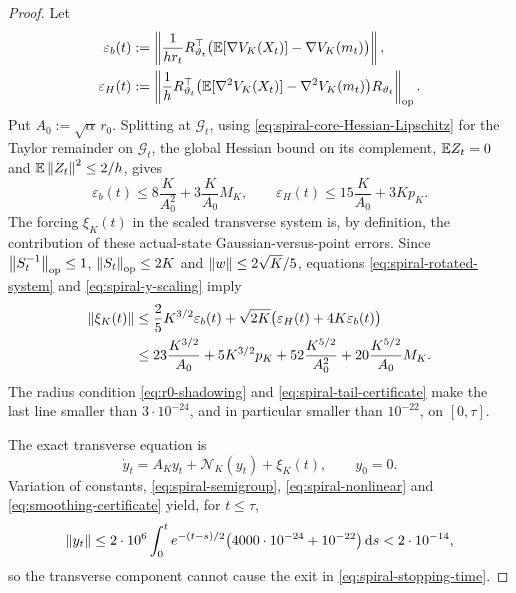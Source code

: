 \begin{proof}
    Let
    \begin{align*}
        \varepsilon_b(t)
        &:=\left\|\frac1{hr_t}R_{\vartheta_t}^\top
            \bigl(\mathbb{E}[\nabla V_K(X_t)]-\nabla V_K(m_t)\bigr)\right\|,\\
        \varepsilon_H(t)
        &:=\left\|\frac1hR_{\vartheta_t}^\top
            \bigl(\mathbb{E}[\nabla^2V_K(X_t)]-\nabla^2V_K(m_t)\bigr)R_{\vartheta_t}\right\|_{\mathrm{op}} .
    \end{align*}
    Put $A_0:=\sqrt\alpha\,r_0$. Splitting at $\mathcal G_t$, using
    \eqref{eq:spiral-core-Hessian-Lipschitz} for the Taylor remainder on $\mathcal G_t$, the
    global Hessian bound on its complement, $\mathbb{E} Z_t=0$ and $\mathbb{E}\left\lVert Z_t\right\rVert^2\leq2/h$, gives
    \begin{equation}\label{eq:spiral-average-errors}
        \varepsilon_b(t)\leq8\frac K{A_0^2}+3\frac K{A_0}M_K,
        \qquad
        \varepsilon_H(t)\leq15\frac K{A_0}+3Kp_K .
    \end{equation}
    The forcing $\xi_K(t)$ in the scaled transverse system is, by definition, the contribution
    of these actual-state Gaussian-versus-point errors. Since $\left\lVert S_t^{-1}\right\rVert_{\mathrm{op}}\leq1$,
    $\left\lVert S_t\right\rVert_{\mathrm{op}}\leq2K$ and $\left\lVert w\right\rVert\leq2\sqrt K/5$, equations
    \eqref{eq:spiral-rotated-system} and \eqref{eq:spiral-y-scaling} imply
    \begin{align}\label{eq:smoothing-certificate}
        \left\lVert \xi_K(t)\right\rVert
        &\leq\frac25K^{3/2}\varepsilon_b(t)
          +\sqrt{2K}\bigl(\varepsilon_H(t)+4K\varepsilon_b(t)\bigr)\notag\\
        &\leq23\frac{K^{3/2}}{A_0}+5K^{3/2}p_K
          +52\frac{K^{5/2}}{A_0^2}+20\frac{K^{5/2}}{A_0}M_K .
    \end{align}
    The radius condition \eqref{eq:r0-shadowing} and \eqref{eq:spiral-tail-certificate} make
    the last line smaller than $3\cdot10^{-24}$, and in particular smaller than $10^{-22}$, on
    $[0,\tau]$.

    The exact transverse equation is
    \begin{equation}\label{eq:transverse-system}
        \dot y_t=A_Ky_t+\mathcal N_K(y_t)+\xi_K(t),
        \qquad y_0=0 .
    \end{equation}
    Variation of constants, \eqref{eq:spiral-semigroup}, \eqref{eq:spiral-nonlinear} and
    \eqref{eq:smoothing-certificate} yield, for $t\leq\tau$,
    \begin{equation*}
        \left\lVert y_t\right\rVert
        \leq2\cdot10^6\int_0^te^{-(t-s)/2}
        \bigl(4000\cdot10^{-24}+10^{-22}\bigr)\,\mathrm{d} s
        <2\cdot10^{-14},
    \end{equation*}
    so the transverse component cannot cause the exit in \eqref{eq:spiral-stopping-time}.


\end{proof}
